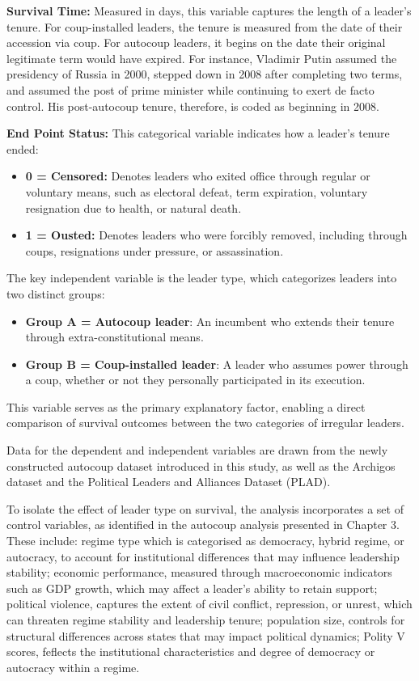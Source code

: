 \documentclass[
  12pt,
]{report}
\providecommand{\tightlist}{%
  \setlength{\itemsep}{0pt}\setlength{\parskip}{0pt}}
\begin{document}
\textbf{Survival Time:} Measured in days, this variable captures the
length of a leader's tenure. For coup-installed leaders, the tenure is
measured from the date of their accession via coup. For autocoup
leaders, it begins on the date their original legitimate term would have
expired. For instance, Vladimir Putin assumed the presidency of Russia
in 2000, stepped down in 2008 after completing two terms, and assumed
the post of prime minister while continuing to exert de facto control.
His post-autocoup tenure, therefore, is coded as beginning in 2008.

\textbf{End Point Status:} This categorical variable indicates how a
leader's tenure ended:

\begin{itemize}
\item
  \textbf{0 = Censored:} Denotes leaders who exited office through
  regular or voluntary means, such as electoral defeat, term expiration,
  voluntary resignation due to health, or natural death.
\item
  \textbf{1 = Ousted:} Denotes leaders who were forcibly removed,
  including through coups, resignations under pressure, or
  assassination.
\end{itemize}

The key independent variable is the leader type, which categorizes
leaders into two distinct groups:

\begin{itemize}
\tightlist
\item
  \textbf{Group A = Autocoup leader}: An incumbent who extends their
  tenure through extra-constitutional means.
\item
  \textbf{Group B = Coup-installed leader}: A leader who assumes power
  through a coup, whether or not they personally participated in its
  execution.
\end{itemize}

This variable serves as the primary explanatory factor, enabling a
direct comparison of survival outcomes between the two categories of
irregular leaders.

Data for the dependent and independent variables are drawn from the
newly constructed autocoup dataset introduced in this study, as well as
the Archigos dataset and the Political Leaders and Alliances Dataset
(PLAD).

To isolate the effect of leader type on survival, the analysis
incorporates a set of control variables, as identified in the autocoup
analysis presented in Chapter 3. These include: regime type which is
categorised as democracy, hybrid regime, or autocracy, to account for
institutional differences that may influence leadership stability;
economic performance, measured through macroeconomic indicators such as
GDP growth, which may affect a leader's ability to retain support;
political violence, captures the extent of civil conflict, repression,
or unrest, which can threaten regime stability and leadership tenure;
population size, controls for structural differences across states that
may impact political dynamics; Polity V scores, feflects the
institutional characteristics and degree of democracy or autocracy
within a regime.
\end{document}
